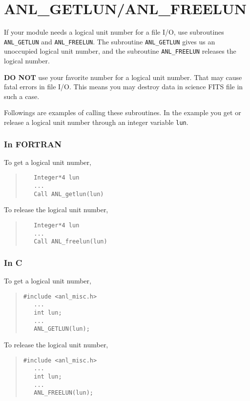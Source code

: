 \section{ANL\_GETLUN/ANL\_FREELUN}\label{sec:ANL_getlun_freelun}
If your module needs a logical unit number for a file I/O,
use subroutines {\tt ANL\_GETLUN} and {\tt ANL\_FREELUN}.
The subroutine {\tt ANL\_GETLUN} gives us an unoccupied logical unit number,
and the subroutine {\tt ANL\_FREELUN} releases the logical number.

{\bf DO NOT} use your favorite number for a logical unit number.
That may cause fatal errors in file I/O.
This means you may destroy data in science FITS file in such a case.

Followings are examples of calling these subroutines.
In the example
you get or release a logical unit number through an integer variable {\tt lun}.

\subsubsection{In FORTRAN}
To get a logical unit number,
\begin{quote}\baselineskip 3.2mm\begin{verbatim}
   Integer*4 lun
   ...
   Call ANL_getlun(lun)
\end{verbatim}\end{quote}

To release the logical unit number,
\begin{quote}\baselineskip 3.2mm\begin{verbatim}
   Integer*4 lun
   ...
   Call ANL_freelun(lun)
\end{verbatim}\end{quote}

\subsubsection{In C}
To get a logical unit number,
\begin{quote}\baselineskip 3.2mm\begin{verbatim}
#include <anl_misc.h>
   ...
   int lun;
   ...
   ANL_GETLUN(lun);
\end{verbatim}\end{quote}

To release the logical unit number,
\begin{quote}\baselineskip 3.2mm\begin{verbatim}
#include <anl_misc.h>
   ...
   int lun;
   ...
   ANL_FREELUN(lun);
\end{verbatim}\end{quote}

